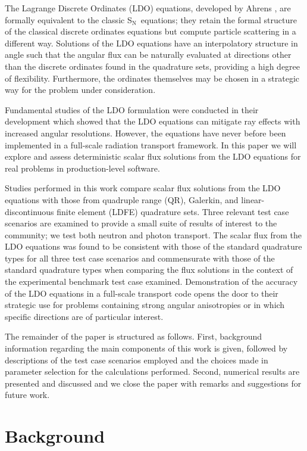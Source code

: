 \documentclass{article} %
\newcommand{\sn}{S$_\mathrm{N}$}
\begin{document}
The Lagrange Discrete Ordinates (LDO) equations, developed by Ahrens
\cite{ahrens}, are formally equivalent to the classic \sn\ equations; they
retain the formal structure of the classical discrete ordinates equations but
compute particle scattering in a different way. Solutions of the LDO equations
have an interpolatory structure in angle such that the angular flux can be naturally
evaluated at directions other than the discrete ordinates found in the quadrature sets,
providing a high degree of flexibility. Furthermore, the ordinates themselves may
be chosen in a strategic way for the problem under consideration.

Fundamental studies of the LDO formulation were conducted in their development
which showed that the LDO equations can mitigate ray effects with increased angular
resolutions. However, the equations have never before been implemented in a
full-scale radiation transport framework. In this paper we will explore and
assess deterministic scalar flux solutions from the LDO equations for real
problems in production-level software.

Studies performed in this work compare scalar flux solutions from the LDO
equations with those from quadruple range (QR), Galerkin, and linear-
discontinuous finite element (LDFE) quadrature sets. Three relevant test case
scenarios are examined to provide a small suite of results of interest to the
community; we test both neutron and photon transport. The scalar flux from the LDO
equations was found to be consistent with those of the standard
quadrature types for all three test case scenarios and commensurate with
those of the standard quadrature types when comparing the flux solutions in
the context of the experimental benchmark test case examined. Demonstration of the
accuracy of the LDO equations in a full-scale transport
code opens the door to their strategic use for problems containing strong
angular anisotropies or in which specific directions are of particular
interest.

The remainder of the paper is structured as follows. First, background information
regarding the main components of this work is given, followed by descriptions
of the test case scenarios employed and the choices made in parameter selection
for the calculations performed. Second, numerical results are presented and discussed
and we close the paper with remarks and suggestions for future work.

\section{Background}
\label{sec:background}
\end{document}
